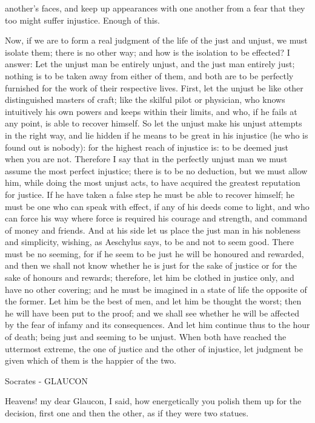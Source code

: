 another's faces, and keep up appearances with one another from a fear that they too might suffer injustice. Enough of this.

Now, if we are to form a real judgment of the life of the just and unjust, we must isolate them; there is no other way; and how is the isolation to be effected? I answer: Let the unjust man be entirely unjust, and the just man entirely just; nothing is to be taken away from either of them, and both are to be perfectly furnished for the work of their respective lives. First, let the unjust be like other distinguished masters of craft; like the skilful pilot or physician, who knows intuitively his own powers and keeps within their limits, and who, if he fails at any point, is able to recover himself. So let the unjust make his unjust attempts in the right way, and lie hidden if he means to be great in his injustice (he who is found out is nobody): for the highest reach of injustice is: to be deemed just when you are not. Therefore I say that in the perfectly unjust man we must assume the most perfect injustice; there is to be no deduction, but we must allow him, while doing the most unjust acts, to have acquired the greatest reputation for justice. If he have taken a false step he must be able to recover himself; he must be one who can speak with effect, if any of his deeds come to light, and who can force his way where force is required his courage and strength, and command of money and friends. And at his side let us place the just man in his nobleness and simplicity, wishing, as Aeschylus says, to be and not to seem good. There must be no seeming, for if he seem to be just he will be honoured and rewarded, and then we shall not know whether he is just for the sake of justice or for the sake of honours and rewards; therefore, let him be clothed in justice only, and have no other covering; and he must be imagined in a state of life the opposite of the former. Let him be the best of men, and let him be thought the worst; then he will have been put to the proof; and we shall see whether he will be affected by the fear of infamy and its consequences. And let him continue thus to the hour of death; being just and seeming to be unjust. When both have reached the uttermost extreme, the one of justice and the other of injustice, let judgment be given which of them is the happier of the two.

Socrates - GLAUCON

Heavens! my dear Glaucon, I said, how energetically you polish them up for the decision, first one and then the other, as if they were two statues.

